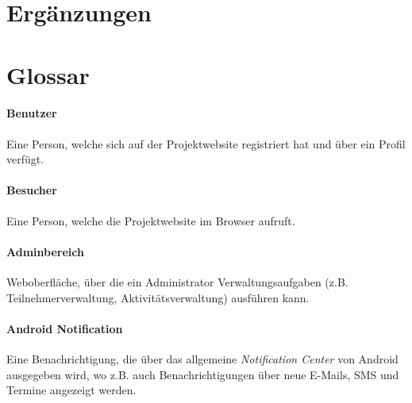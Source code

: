 \documentclass[10pt,a4paper]{article}
\begin{document}
\section{Erg\"anzungen}

\section{Glossar}

\paragraph{Benutzer} Eine Person, welche sich auf der Projektwebsite registriert hat und über ein Profil verfügt.

\paragraph{Besucher} Eine Person, welche die Projektwebsite im Browser aufruft.

\paragraph{Adminbereich} Weboberfläche, über die ein Administrator Verwaltungsaufgaben (z.B. Teilnehmerverwaltung, Aktivitätsverwaltung) ausführen kann.

\paragraph{Android Notification} Eine Benachrichtigung, die über das allgemeine \emph{Notification Center} von Android ausgegeben wird, wo z.B. auch Benachrichtigungen über neue E-Mails, SMS und Termine angezeigt werden.
\end{document}
